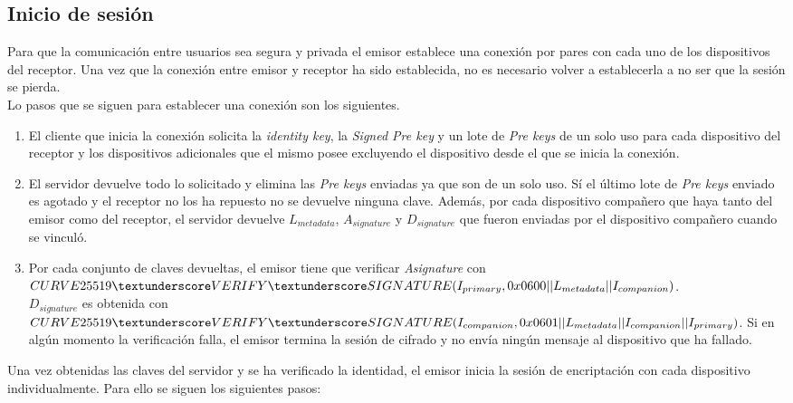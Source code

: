 \subsection{Inicio de sesión}
Para que la comunicación entre usuarios sea segura y privada el emisor establece una conexión por pares con cada uno de los dispositivos del receptor. Una vez que la conexión entre emisor y receptor ha sido establecida, no es necesario volver a establecerla a no ser que la sesión se pierda.\\
Lo pasos que se siguen para establecer una conexión son los siguientes.
\begin{enumerate}
	\item El cliente que inicia la conexión solicita la \emph{identity key}, la \emph{Signed Pre key} y un lote de \emph{Pre keys} de un solo uso para cada dispositivo del receptor y los dispositivos adicionales que el mismo posee excluyendo el dispositivo desde el que se inicia la conexión. 
	\item El servidor devuelve todo lo solicitado y elimina las \emph{Pre keys} enviadas ya que son de un solo uso. Sí el último lote de \emph{Pre keys} enviado es agotado y el receptor no los ha repuesto no se devuelve ninguna clave. Además, por cada dispositivo compañero que haya tanto del emisor como del receptor, el servidor devuelve $L_{metadata}$, $A_{signature}$ y $D_{signature}$ que fueron enviadas por el dispositivo compañero cuando se vinculó.
	\item Por cada conjunto de claves devueltas, el emisor tiene que verificar \emph{Asignature} con\\ $CURVE25519\textunderscore VERIFY \textunderscore SIGNATURE(I_{primary}, 0x0600 || L_{metadata}\\ || I_{companion})$.\\
	$D_{signature}$ es obtenida con\\ $CURVE25519\textunderscore VERIFY\textunderscore SIGNATURE(I_{companion},0x0601 ||\\ L_{metadata} || I_{companion} || I_{primary})$.
	Si en algún momento la verificación falla, el emisor termina la sesión de cifrado y no envía ningún mensaje al dispositivo que ha fallado.
\end{enumerate}
Una vez obtenidas las claves del servidor y se ha verificado la identidad, el emisor inicia la sesión de encriptación con cada dispositivo individualmente. Para ello se siguen los siguientes pasos:
